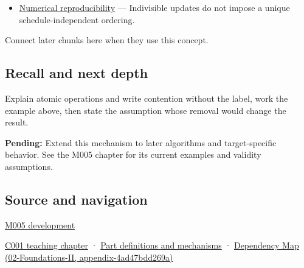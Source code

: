 \begin{itemize}
\tightlist
\item
  \hyperref[appendix-5f1a2c3f97ff]{Numerical reproducibility} --- Indivisible updates do not impose a unique schedule-independent ordering.
\end{itemize}

Connect later chunks here when they use this concept.

\subsection{Recall and next depth}\label{appendix-e12d1b03fefb-recall-and-next-depth}

Explain atomic operations and write contention without the label, work the example above, then state the assumption whose removal would change the result.

\textbf{Pending:} Extend this mechanism to later algorithms and target-specific behavior. See the M005 chapter for its current examples and validity assumptions.

\subsection{Source and navigation}\label{appendix-e12d1b03fefb-source-and-navigation}

\hyperref[01-foundations-i-ch001-when-arithmetic-meets-uncertainty]{M005 development}

\hyperref[01-foundations-i-ch001-from-a-signal-to-an-interpretation]{C001 teaching chapter} · \hyperref[appendix-fd090d982a15]{Part definitions and mechanisms} · \href{../02-Foundations-II/main.pdf\#nameddest=appendix-4ad47bdd269a}{Dependency Map (02-Foundations-II, appendix-4ad47bdd269a)}
